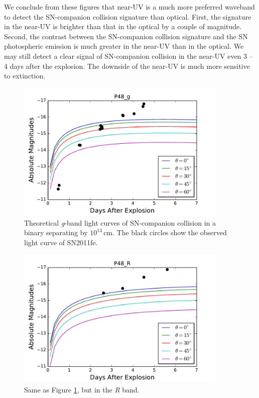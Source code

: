 \documentclass[11pt]{article}
\begin{document}
We conclude from these figures that near-UV is a much more preferred
waveband to detect the SN-companion collision signature than
optical. First, the signature in the near-UV is brighter than that in
the optical by a couple of magnitude. Second, the contrast between the
SN-companion collision signature and the SN photospheric emission is
much greater in the near-UV than in the optical. We may still detect a
clear signal of SN-companion collision in the near-UV even 3 -- 4 days
after the explosion. The downside of the near-UV is much more
sensitive to extinction.

\begin{figure}[htb]
  \centering
  \includegraphics[width=0.9\textwidth]{P48_g.pdf}
  \caption{Theoretical \textit{g}-band light curves of SN-companion
    collision in a binary separating by $10^{13}\,\textrm{cm}$. The
    black circles show the observed light curve of SN2011fe. }
\label{fig:sn_companion_g_band}
\end{figure}

\begin{figure}[htb]
  \centering
  \includegraphics[width=0.9\textwidth]{P48_R.pdf}
  \caption{Same as Figure \ref{fig:sn_companion_g_band}, but in the \textit{R} band.}
  \label{fig:sn_companion_R_band}
\end{figure}
\end{document}
